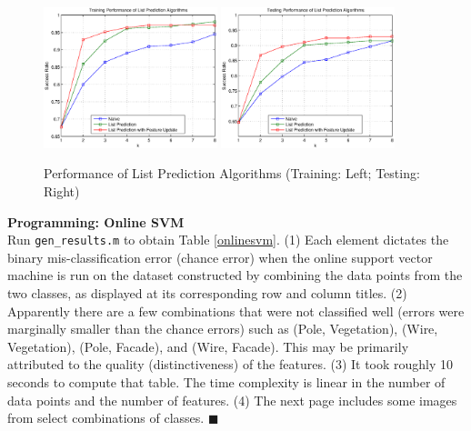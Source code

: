 \documentclass{article}
\newcommand{\qed}{\hfill$\blacksquare$}
\begin{document}
\begin{figure}
	\centering
	\includegraphics[width = 0.45\textwidth]{train.eps}
	\includegraphics[width = 0.45\textwidth]{test.eps}	
	\caption{Performance of List Prediction Algorithms (Training: Left; Testing: Right)}
	\label{listpred}
\end{figure}

{\large\bf Programming: Online SVM}\\[1em]

Run {\tt gen\_results.m} to obtain Table \ref{onlinesvm}. (1) Each element dictates the binary
mis-classification error (chance error) when the online support vector machine is run on 
the dataset constructed by combining the data points from the two classes, as displayed
at its corresponding row and column titles. (2) Apparently there are a few combinations
that were not classified well (errors were marginally smaller than the chance errors)
such as (Pole, Vegetation), (Wire, Vegetation), (Pole, Facade), and (Wire, Facade). This
may be primarily attributed to the quality (distinctiveness) of the features. (3) It took
roughly 10 seconds to compute that table. The time complexity is linear in the number of
data points and the number of features. (4) The next page includes some images from 
select combinations of classes. \qed 
\end{document}
